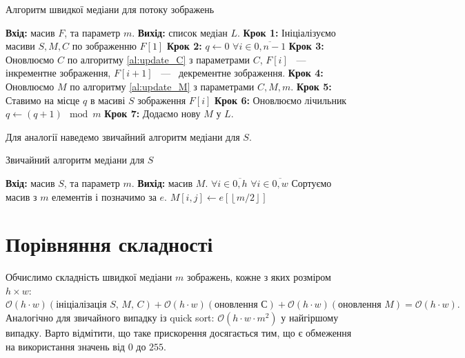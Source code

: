 \begin{algorithm}[H]
    \caption{Алгоритм швидкої медіани для потоку зображень}
    \begin{algorithmic}
        \State \textbf{Вхід:} масив $F$, та параметр $m$.
        \State \textbf{Вихід:} список медіан $L$.
        \State \textbf{Крок 1:} Ініціалізуємо масиви $S, M, C$ по зображенню $F[1]$
        \State \textbf{Крок 2:} $q \gets 0$ 
        \State  $\forall i \in \overline{0,n-1}$
        \State \qquad \textbf{Крок 3:} Оновлюємо $C$ по алгоритму \ref{al:update_C} з параметрами $C$,
        $F[i]$ ~---~ інкрементне зображення, $F[i+1]$ ~---~ декрементне зображення.
        \State \qquad \textbf{Крок 4:} Оновлюємо $M$ по алгоритму \ref{al:update_M} з параметрами $C, M, m$.
        \State \qquad \textbf{Крок 5:} Ставимо на місце $q$ в масиві $S$ зображення $F[i]$
        \State \qquad \textbf{Крок 6:} Оновлюємо лічильник $q \gets (q+1) \mod m$
        \State \qquad \textbf{Крок 7:} Додаємо нову $M$ у $L$.
    \end{algorithmic}
    \label{al:fast_median_video}
\end{algorithm}

Для аналогії наведемо звичайний алгоритм медіани для $S$.
\begin{algorithm}[H]
    \caption{Звичайний алгоритм медіани для $S$}
    \begin{algorithmic}
        \State \textbf{Вхід:} масив $S$, та параметр $m$.
        \State \textbf{Вихід:} масив $M$.
        \State  $\forall i \in \overline{0,h}$
        \State \qquad  $\forall i \in \overline{0,w}$
        \State \qquad \qquad  Сортуємо масив з $m$ елементів і позначимо за $e$.
        \State \qquad \qquad  $M[i,j] \gets e[\left\lfloor m/2 \right\rfloor ]$ 
    \end{algorithmic}
\end{algorithm}

\section{Порівняння складності}
Обчислимо складність швидкої медіани $m$ зображень, кожне з яких розміром $h \times w$:
$
    \mathcal{O}(h \cdot w) (\textit{ініціалізація S, M, C} )
    + \mathcal{O}(h \cdot w) (\textit{оновлення С})
    + \mathcal{O}(h \cdot w) (\textit{оновлення M}) = \mathcal{O}(h \cdot w).
$
Аналогічно для звичайного випадку із quick sort: $\mathcal{O}(h \cdot w \cdot m^2)$ у найгіршому випадку.
Варто відмітити, що таке прискорення досягається тим,
що є обмеження на використання значень від $0$ до $255$.

\clearpage
